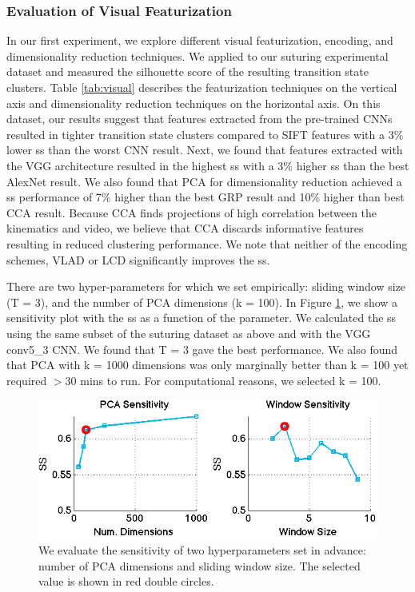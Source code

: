 \subsubsection{Evaluation of Visual Featurization}
In our first experiment, we explore different visual featurization, encoding, and dimensionality reduction techniques.
We applied \tsc to our suturing experimental dataset and measured the silhouette score of the resulting transition state clusters.
Table \ref{tab:visual} describes the featurization techniques on the vertical axis and dimensionality reduction techniques on the horizontal axis.
On this dataset, our results suggest that features extracted from the pre-trained CNNs resulted in tighter transition state clusters compared to SIFT features with a 3\% lower \textsf{ss} than the worst CNN result.
Next, we found that features extracted with the VGG architecture resulted in the highest \textsf{ss} with a 3\% higher \textsf{ss} than the best AlexNet result.
We also found that PCA for dimensionality reduction achieved a \textsf{ss} performance of 7\% higher than the best GRP result and 10\% higher than best CCA result.
Because CCA finds projections of high correlation between the kinematics and video, we believe that CCA discards informative features resulting in reduced clustering performance. 
We note that neither of the encoding schemes, VLAD or LCD significantly improves the \textsf{ss}.

There are two hyper-parameters for \tsc which we set empirically: sliding window size (T = 3), and the number of PCA dimensions (k = 100).
In Figure \ref{fig:sensitvity}, we show a sensitivity plot with the \textsf{ss} as a function of the parameter.
We calculated the \textsf{ss} using the same subset of the suturing dataset as above and with the VGG conv5\_3 CNN.
We found that T = 3 gave the best performance.
We also found that PCA with k = 1000 dimensions was only marginally better than k = 100 yet required $>$30 mins to run.
For computational reasons, we selected k = 100.


\begin{figure}[ht!]
\centering
    \includegraphics[width=0.95\linewidth]{tsc-experiments/sensitivity}
    \caption{We evaluate the sensitivity of two hyperparameters set in advance: number of PCA dimensions and sliding window size. The selected value is shown in red double circles.\label{fig:sensitvity}}
\end{figure}


